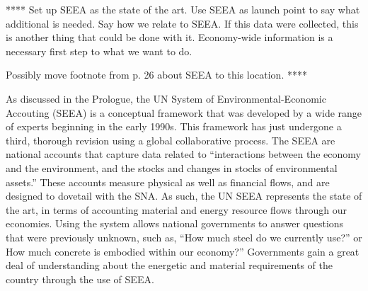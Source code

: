 %	
%	
%	
%	
%	
%	
%	
%	
%	

**** 
Set up SEEA as the state of the art. 
Use SEEA as launch point to say what additional is needed.
Say how we relate to SEEA. 
If this data were collected, this is another thing that could be done with it.
Economy-wide information is a necessary first step to what we want to do.

Possibly move footnote from p. 26 about SEEA to this location.
****

As discussed in the Prologue, 
the UN System of Environmental-Economic Accouting (SEEA) 
is a conceptual framework 
that was developed by a wide range of experts 
beginning in the early 1990s. 
This framework has just undergone a third, 
thorough revision using a global collaborative process.
The SEEA are national accounts that
capture data related to ``interactions between the
economy and the environment, and the stocks
and changes in stocks of environmental assets.''\cite[p. 1]{ UNSEEA2014}
These accounts measure physical as well as financial flows, and are
designed to dovetail with the SNA.
As such, the UN SEEA represents the state of the art,
in terms of accounting material and energy resource flows
through our economies.
Using the system allows national governments to answer questions
that were previously unknown,
such as, 
``How much steel do we currently use?'' or
How much concrete is embodied within our economy?''
Governments gain a great deal of understanding about the energetic
and material requirements of the country through the use of SEEA.

